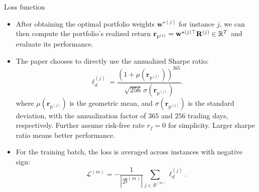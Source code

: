 \documentclass[10pt,aspectratio=169]{beamer}
\newcommand{\Bset}{\mathcal{B}}
\newcommand{\Loss}{\mathcal{L}}
\newcommand{\SigmaMat}{\Sigma}
\begin{document}
\begin{frame}{Loss function}
  \small 

  \begin{itemize}
  \item  After obtaining the optimal portfolio weights $\mathbf w^{\star(j)}$ for instance $j$, we can then compute the portfolio's realized return $\mathbf{r}_{\text{p}^{(j)}} = \mathbf w^{\star(j)\top} \mathbf R^{(j)} \in \mathbb{R}^T$ and evaluate its performance.


  \item  The paper chooses to directly use the annualized Sharpe ratio:
  \[
    \ell_d^{(j)}
    =
    \frac{(1+\mu(\mathbf{r}_{\text{p}^{(j)}}))^{365}}
         {\sqrt{256}\,\sigma(\mathbf{r}_{\text{p}^{(j)}})}.
  \]
  where $\mu(\mathbf{r}_{\text{p}^{(j)}})$ is the geometric mean, and $\sigma(\mathbf{r}_{\text{p}^{(j)}})$ is the standard deviation, with the annualization factor of $365$ and $256$ trading days, respectively. Further assume risk-free rate $r_f = 0$ for simplicity. Larger sharpe ratio means better performance.

  \item For the training batch, the loss is averaged across instances with negative sign:
  \[
    \Loss^{(m)} = -\frac{1}{|\Bset^{(m)}|} \sum_{j\in\Bset^{(m)}} \ell_d^{(j)}.
  \]

  \end{itemize}
\end{frame}
\end{document}
